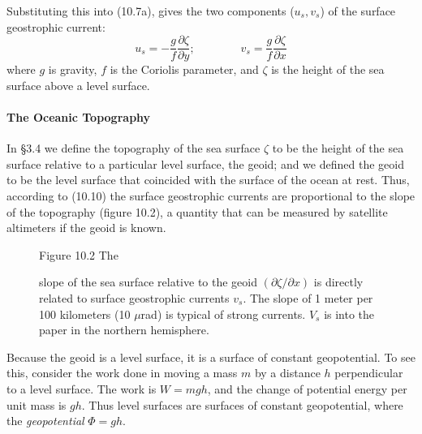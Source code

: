 Substituting this into (10.7a), gives the two components ($u_s, v_s$)
of the surface geostrophic current:
\begin{equation}
u_s =-\frac{g}{f}\frac{\partial\zeta}{\partial y}; \qquad \qquad
v_s =\frac{g}{f}\frac{\partial\zeta}{\partial x}
\end{equation}
where $g$ is gravity, $f$ is the Coriolis parameter, and $\zeta$ is the height of the sea surface above a
level surface.

\paragraph{The Oceanic Topography}
In \S 3.4 we define the topography of
the sea surface $\zeta$ to be the height of the sea surface relative
to a particular level surface, the
geoid; and we defined the geoid to be the
level surface that coincided with the surface of
the ocean at rest.  Thus, according to (10.10) the surface geostrophic
currents are proportional to the slope of the topography (figure
10.2), a quantity that can be measured by satellite altimeters if the
geoid is known.

\begin{figure}[h!]
\vspace{-2ex}
\footnotesize
Figure 10.2 The \rule{0mm}{3ex}slope of the sea surface relative to
the geoid $(\partial\zeta/\partial x)$ is directly
related to surface geostrophic currents $v_s$.  The slope of 1 meter
per 100 kilometers (10 $\mu$rad) is typical of strong currents.  $V_s$
is into the paper in the northern hemisphere.
\label{fig:geostrophicsketch}
\vspace{-2ex}
\end{figure}

Because the geoid is a level surface, it is a surface of constant geopotential. To see this,
consider the work done in moving a mass $m$ by a distance $h$
perpendicular to a level surface. The work is
$W=mgh$, and the change of potential energy per unit mass is
$gh$. Thus level surfaces are surfaces of
constant geopotential, where the
\textit{geopotential} $\Phi = gh$.

